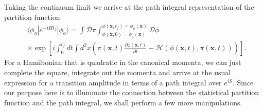        \colorbox{red}{ } Taking the continuum limit we arrive at the path integral representation of the partition function
        \begin{align}
            &\langle \phi_a | e^{-i H t_f} | \phi_a \rangle = \int \mathcal{D} \pi \int_{\phi(\bm{x},0) =\phi_a(\bm{x})}^{\phi(\bm{x}, t_f) = \phi_a(\bm{x})} \mathcal{D} \phi \nonumber \\
            &\times \exp \left[i \int_0^{t_f} dt \int d^2 x \left( \pi(\bm{x} ,t) \frac{\partial\phi(\bm{x}, t)}{ \partial t} - \mathcal{H}\left(\phi(\bm{x},t), \pi(\bm{x},t)\right) \right) \right] \label{eq:path_integral_amplitude}.
        \end{align}
        For a Hamiltonian that is quadratic in the canonical momenta, we can just complete the square, integrate out the momenta and arrive at the usual expression for a transition amplitude in terms of a path integral over $e^{i S}$. Since our purpose here is to illuminate the connection between the statistical partition function and the path integral, we shall perform a few more manipulations. 
